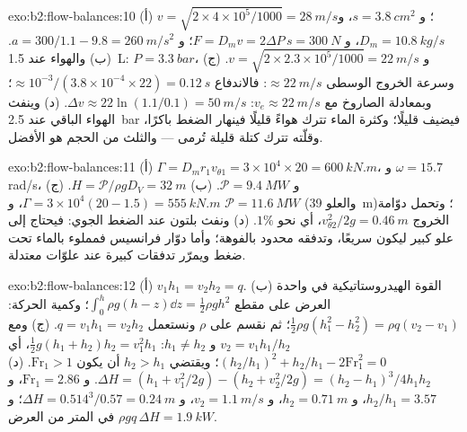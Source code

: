 \begin{solution}{exo:b2:flow-balances:10}
(أ) $v = \sqrt{2 \times 4 \times 10^5/1000} = \qty{28}{m/s}$؛ و $s = \qty{3.8}{cm^2}$، و $D_m =
\qty{10.8}{kg/s}$، و $F = D_mv = 2\Delta P\,s = \qty{300}{N}$؛ و $a = 300/1.1 - 9.8 =
\qty{260}{m/s^2}$. (ب) والهواء عند \qty{1.5}{L}: $P = \qty{3.3}{bar}$، و $v = \sqrt{2 \times 2.3 \times
10^5/1000} = \qty{22}{m/s}$. (ج) وسرعة الخروج الوسطى $\approx \qty{22}{m/s}$: فالاندفاع $\approx 10^{-3}
/(3.8 \times 10^{-4} \times 22) = \qty{0.12}{s}$؛ وبمعادلة الصاروخ مع $v_e \approx \qty{22}{m/s}$:
$\Delta v \approx 22\ln(1.1/0.1) = \qty{50}{m/s}$. (د) وينفث الهواء الباقي عند \qty{2.5}{bar}
فيضيف قليلًا؛ وكثرة الماء تترك هواءً قليلًا فينهار
الضغط باكرًا، وقلّته تترك كتلة قليلة تُرمى ---
والثلث من الحجم هو الأفضل.
\end{solution}

\begin{solution}{exo:b2:flow-balances:11}
(أ) $\Gamma = D_mr_1v_{\theta1} = 3 \times 10^4 \times 20 = \qty{600}{kN.m}$، و $\omega = 15.7$ rad/s،
و $\mathcal P = \qty{9.4}{MW}$. (ب) $H = \mathcal P/\rho gD_V = \qty{32}{m}$. (ج) $\Gamma = 3 \times
10^4(20 - 1.5) = \qty{555}{kN.m}$، و $\mathcal P = \qty{11.6}{MW}$ (والعلو \qty{39}{m})؛ وتحمل
دوّامة الخروج $v_{\theta2}^2/2g = \qty{0.46}{m}$، أي نحو $1\%$. (د) ونفث بلتون
عند الضغط الجوي: فيحتاج إلى علو كبير ليكون سريعًا، وتدفقه
محدود بالفوهة؛ وأما دوّار فرانسيس فمملوء بالماء تحت
ضغط ويمرّر تدفقات كبيرة عند علوّات معتدلة.
\end{solution}

\begin{solution}{exo:b2:flow-balances:12}
(أ) $v_1h_1 = v_2h_2 = q$. (ب) القوة الهيدروستاتيكية في واحدة العرض على
مقطع $\int_0^h\rho g(h - z)\dd z = \tfrac12\rho gh^2$؛ وكمية الحركة: $\tfrac12\rho g(h_1^2
- h_2^2) = \rho q(v_2 - v_1)$؛ ثم نقسم على $\rho$ ونستعمل $q = v_1h_1 = v_2h_2$.
(ج) ومع $v_2 = v_1h_1/h_2$ و $h_1 \ne h_2$: $\tfrac12g(h_1 + h_2)h_2 = v_1^2h_1$،
أي $(h_2/h_1)^2 + h_2/h_1 - 2\mathrm{Fr}_1^2 = 0$؛ ويقتضي $h_2 > h_1$ أن يكون $\mathrm{Fr}_1 > 1$.
(د) $\Delta H = (h_1 + v_1^2/2g) - (h_2 + v_2^2/2g) = (h_2 - h_1)^3/4h_1h_2$.
و $\mathrm{Fr}_1 = 2.86$، و $h_2/h_1 = 3.57$، و $h_2 = \qty{0.71}{m}$، و $v_2 = \qty{1.1}{m/s}$،
و $\Delta H = 0.514^3/0.57 = \qty{0.24}{m}$؛ و $\rho gq\,\Delta H = \qty{1.9}{kW}$ في المتر
من العرض.
\end{solution}

